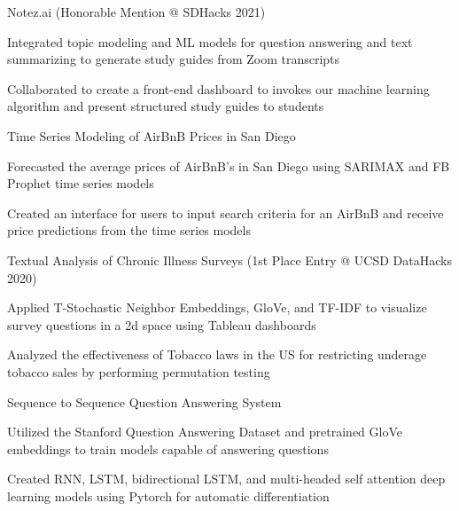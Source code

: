 
\begin{cventries}

\cventry
    {} %
    {Notez.ai (Honorable Mention @ SDHacks 2021)} %
    {} %
    {} %
    {
      \begin{cvitems} %
        \item {Integrated topic modeling and ML models for question answering and text summarizing to generate study guides from Zoom transcripts }
		\item {Collaborated to create a front-end dashboard to invokes our machine learning algorithm and present structured study guides to students}
      \end{cvitems}
    }
    
\cventry
    {} %
    {Time Series Modeling of AirBnB Prices in San Diego} %
    {} %
    {} %
    {
      \begin{cvitems} %
        \item {Forecasted the average prices of AirBnB's in San Diego using SARIMAX and FB Prophet time series models}
		\item {Created an interface for users to input search criteria for an AirBnB and receive price predictions from the time series models}
      \end{cvitems}
    }

\cventry
    {} %
    {Textual Analysis of Chronic Illness Surveys (1st Place Entry @ UCSD DataHacks 2020)} %
    {} %
    {} %
    {
      \begin{cvitems} %
        \item {Applied T-Stochastic Neighbor Embeddings, GloVe, and TF-IDF to visualize survey questions in a 2d space using Tableau dashboards}
		\item {Analyzed the effectiveness of Tobacco laws in the US for restricting underage tobacco sales by performing permutation testing}
      \end{cvitems}
    }
    
\cventry
    {} %
    {Sequence to Sequence Question Answering System} %
    {} %
    {} %
    {
      \begin{cvitems} %
        \item {Utilized the Stanford Question Answering Dataset and pretrained GloVe embeddings to train models capable of answering questions}
		\item {Created RNN, LSTM, bidirectional LSTM, and multi-headed self attention deep learning models using Pytorch for automatic differentiation}
      \end{cvitems}
    }
    
\end{cventries}